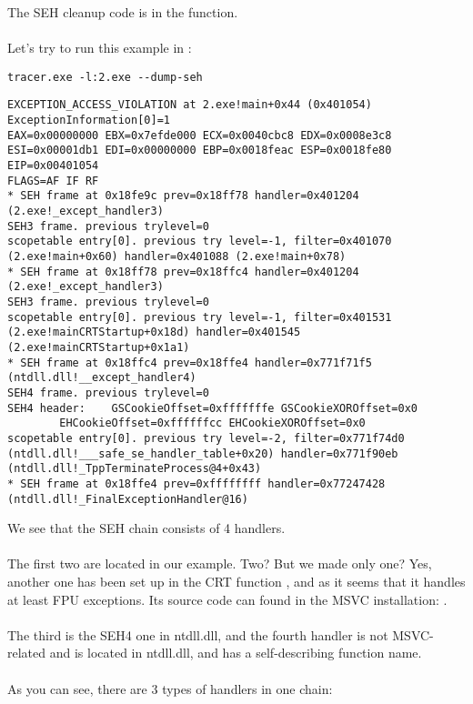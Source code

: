 The SEH cleanup code is in the  function.\\
\\
Let's try to run this example in \tracer{}:

\begin{lstlisting}
tracer.exe -l:2.exe --dump-seh
\end{lstlisting}

\begin{lstlisting}[caption=tracer.exe output]
EXCEPTION_ACCESS_VIOLATION at 2.exe!main+0x44 (0x401054) ExceptionInformation[0]=1
EAX=0x00000000 EBX=0x7efde000 ECX=0x0040cbc8 EDX=0x0008e3c8
ESI=0x00001db1 EDI=0x00000000 EBP=0x0018feac ESP=0x0018fe80
EIP=0x00401054
FLAGS=AF IF RF
* SEH frame at 0x18fe9c prev=0x18ff78 handler=0x401204 (2.exe!_except_handler3)
SEH3 frame. previous trylevel=0
scopetable entry[0]. previous try level=-1, filter=0x401070 (2.exe!main+0x60) handler=0x401088 (2.exe!main+0x78)
* SEH frame at 0x18ff78 prev=0x18ffc4 handler=0x401204 (2.exe!_except_handler3)
SEH3 frame. previous trylevel=0
scopetable entry[0]. previous try level=-1, filter=0x401531 (2.exe!mainCRTStartup+0x18d) handler=0x401545 (2.exe!mainCRTStartup+0x1a1)
* SEH frame at 0x18ffc4 prev=0x18ffe4 handler=0x771f71f5 (ntdll.dll!__except_handler4)
SEH4 frame. previous trylevel=0
SEH4 header:	GSCookieOffset=0xfffffffe GSCookieXOROffset=0x0
		EHCookieOffset=0xffffffcc EHCookieXOROffset=0x0
scopetable entry[0]. previous try level=-2, filter=0x771f74d0 (ntdll.dll!___safe_se_handler_table+0x20) handler=0x771f90eb (ntdll.dll!_TppTerminateProcess@4+0x43)
* SEH frame at 0x18ffe4 prev=0xffffffff handler=0x77247428 (ntdll.dll!_FinalExceptionHandler@16)
\end{lstlisting}

We see that the SEH chain consists of 4 handlers.\\
\\
The first two are located in our example. Two?
But we made only one?
Yes, another one has been set up in the \ac{CRT} function , and as it seems that it handles at least \ac{FPU} exceptions.
Its source code can found in the MSVC installation: .\\
\\
The third is the SEH4 one in ntdll.dll, 
and the fourth handler is not MSVC-related and is located in ntdll.dll, and has a self-describing function name.\\
\\
As you can see, there are 3 types of handlers in one chain:

